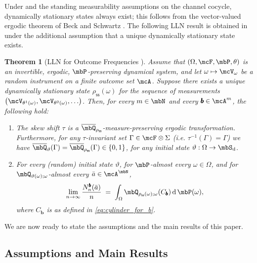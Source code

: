 \documentclass[a4paper]{article}
\numberwithin{equation}{section}   %
\theoremstyle{plain}   %
\theoremstyle{plain}   %
\newtheorem{theorem}{Theorem}[section]  %
\theoremstyle{examplestyle}
\DeclareMathOperator{\states}{\mbS_d}   %
\DeclareMathOperator{\pr}{\mbP}           %
\DeclareMathOperator{\outcomes}{\mcA^\mbN}      %
\newcommand{\s}{\rho_{\mathsf{ss}}}     %
\newcommand{\dee}{\mathrm{d}}           %
\begin{document}
    Under  and the standing measurability assumptions on the channel cocycle, dynamically stationary states always exist; this follows from the vector-valued ergodic theorem of Beck and Schwartz \cite{Beck_1957}.
    The following LLN result is obtained in \cite{qtlln} under the additional assumption that a unique dynamically stationary state exists.
        
    \begin{theorem}[LLN for Outcome Frequencies \cite{qtlln}]
    \label{thm:LLN}
        Assume that $\left(\Omega,\mcF,\pr,\theta\right)$ is an invertible, ergodic, \(\pr\)-preserving dynamical system, and let \(\omega\mapsto\mcV_\omega\) be a random instrument on a finite outcome set \(\mcA\).
        Suppose there exists a \emph{unique} dynamically stationary state \({\s}(\omega)\) for the sequence of measurements \(\left(\mcV_{\theta^{1}(\omega)},\mcV_{\theta^{2}(\omega)},\ldots\right)\).
        Then, for every \(m\in\mbN\) and every \(\pmb b\in\mcA^m\), the following hold:
        \begin{enumerate}
            \item The skew shift \(\tau\) is a \(\overline\mbQ_{\s}\)-measure-preserving ergodic transformation. 
            Furthermore, for any $\tau$-invariant set $\Gamma\in \mcF\otimes\Sigma$ (i.e. $\tau^{-1}(\Gamma) = \Gamma$) we have $\overline\mbQ_{\vartheta}(\Gamma) = \overline\mbQ_{\s}(\Gamma) \in \{0,1\}$, for any initial state $\vartheta:\Omega\to \states$.
            \item For every (random) initial state \(\vartheta\), for \(\pr\)-almost every \(\omega\in\Omega\), and for \(\mbQ_{\vartheta(\omega);\omega}\)-almost every \(\bar a\in\outcomes\),
            \[
                \lim_{n\to\infty} \frac{N_n^{\pmb{b}}(\bar a)}{n}
                \;=\;
                \int_\Omega \mbQ_{{\s}(\omega);\omega}(C_{\pmb{b}})\,\dee\pr(\omega),
            \]
            where $C_{\pmb{b}}$ is as defined in \eqref{eq:cylinder_for_b}.
        \end{enumerate}
    \end{theorem}

    We are now ready to state the assumptions and the main results of this paper. 
    
 
\subsection{Assumptions and Main Results}
\label{section:assumption_and_main}
\end{document}
